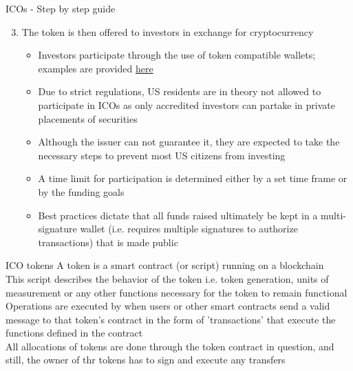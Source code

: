 \documentclass[11pt]{beamer}
\begin{document}

\begin{frame}{ICOs - Step by step guide}
	\begin{enumerate}
		\setcounter{enumi}{2}
		\item The token is then offered to investors in exchange for cryptocurrency
		\begin{itemize}
			\item Investors participate through the use of token compatible wallets; examples are provided \href{https://tokenmarket.net/what-is/how-to-participate-ethereum-token-crowdsale/}{here}
			\item Due to strict regulations, US residents are in theory not allowed to participate in ICOs as only accredited investors can partake in private placements of securities
			\item Although the issuer can not guarantee it, they are expected to take the necessary steps to prevent most US citizens from investing
			\item A time limit for participation is determined either by a set time frame or by the funding goals
			\item Best practices dictate that all funds raised ultimately be kept in a multi-signature wallet (i.e. requires multiple signatures to authorize transactions) that is made public
		\end{itemize}
	\end{enumerate}
\end{frame}


\begin{frame}{ICO tokens}
	A token is a smart contract (or script) running on a blockchain\\ \vspace{3mm}
	This script describes the behavior of the token i.e. token generation, units of measurement or any other functions necessary for the token to remain functional\\ \vspace{3mm}
	Operations are executed by when users or other smart contracts send a valid message to that token's contract in the form of 'transactions' that execute the functions defined in the contract\\ \vspace{3mm}
	All allocations of tokens are done through the token contract in question, and still, the owner of thr tokens has to sign and execute any transfers
\end{frame}
\end{document}
